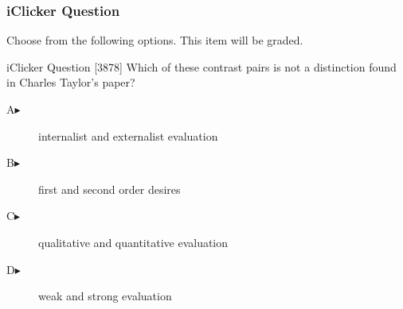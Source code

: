 \begin{frame}
  \frametitle{iClicker Question}
Choose from the following options. This item will be graded.
\begin{block}{iClicker Question}
[3878] Which of these contrast pairs is not a distinction found in Charles
Taylor's paper?
\end{block}
\begin{description}
\item[A\hspace{.2in}$\blacktriangleright$] internalist and externalist evaluation
\item[B\hspace{.2in}$\blacktriangleright$] first and second order desires
\item[C\hspace{.2in}$\blacktriangleright$] qualitative and quantitative evaluation
\item[D\hspace{.2in}$\blacktriangleright$] weak and strong evaluation
\end{description}
\end{frame}
